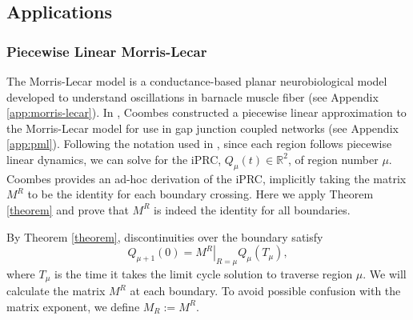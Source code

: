 \documentclass[a4paper,12pt]{article}
\begin{document}
\subsection{Applications}
\subsubsection{Piecewise Linear Morris-Lecar}
The Morris-Lecar model is a conductance-based planar neurobiological model developed to understand oscillations in barnacle muscle fiber \cite{MorrisLecar:1981} (see Appendix \ref{app:morris-lecar}).  In \cite{Coombes:2008:SIADS}, Coombes constructed a piecewise linear approximation to the Morris-Lecar model for use in gap junction coupled networks (see Appendix \ref{app:pml}).  Following the notation used in \cite{Coombes:2008:SIADS}, since each region follows piecewise linear dynamics, we can solve for the iPRC, $Q_\mu(t) \in \mathbb{R}^2$, of region number $\mu$.  Coombes provides an ad-hoc derivation of the iPRC, implicitly taking the matrix $M^R$ to be the identity for each boundary crossing.  Here we apply Theorem \ref{theorem} and prove that $M^R$ is indeed the identity for all boundaries.

By Theorem \ref{theorem}, discontinuities over the boundary satisfy
\begin{equation}
Q_{\mu+1}(0) = \left. M^{R} \right |_{R=\mu}   Q_\mu(T_\mu),
\end{equation}
where $T_\mu$ is the time it takes the limit cycle solution to traverse region $\mu$.  We will calculate the matrix $M^R$ at each boundary.  To avoid possible confusion with the matrix exponent, we define $M_R := M^R$.
\end{document}

